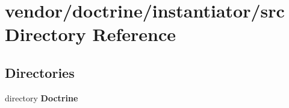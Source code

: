 \section{vendor/doctrine/instantiator/src Directory Reference}
\label{dir_ad8eee4c7bff833dcffda9fba161b3ba}
\subsection*{Directories}
\begin{DoxyCompactItemize}
\item 
directory {\bf Doctrine}
\end{DoxyCompactItemize}

